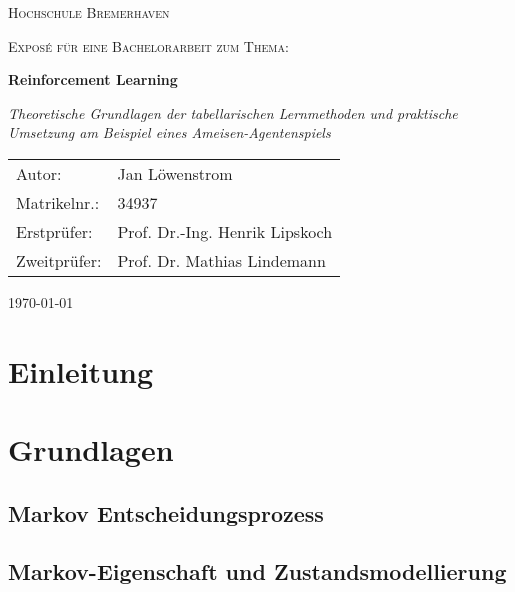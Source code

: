 \documentclass[12pt]{scrartcl}
\numberwithin{equation}{section}
\begin{document}
\begin{titlepage}
	\centering	
	{\scshape\LARGE Hochschule Bremerhaven \par}
	\vspace{1cm}
	{\scshape\Large Exposé für eine Bachelorarbeit zum Thema:\par}
	\vspace{1.5cm}
	{\huge\bfseries Reinforcement Learning\par}
	\vspace{2cm}
	{\Large\itshape Theoretische Grundlagen der tabellarischen Lernmethoden und praktische Umsetzung am Beispiel eines Ameisen-Agentenspiels
	\par}
	\vfill
	\begin{tabularx}{\textwidth}{lX}
		Autor: & Jan Löwenstrom \\
		Matrikelnr.: & 34937 \\
		Erstprüfer: & Prof. Dr.-Ing. Henrik Lipskoch \\
		Zweitprüfer: & Prof. Dr. Mathias Lindemann \\
	\end{tabularx}  
    \vfill

	{\large \today \par}       
\end{titlepage}

\setcounter{page}{2}
\tableofcontents
\pagebreak
\listoffigures
\newpage


\noindent
\section{Einleitung}


\pagebreak

\section{Grundlagen}
	
	\subsection{Markov Entscheidungsprozess}
	

	\subsection{Markov-Eigenschaft und Zustandsmodellierung}
	
	\pagebreak
\end{document}
